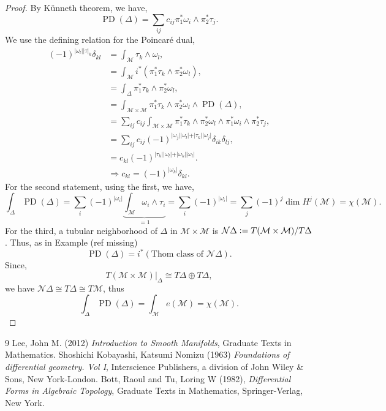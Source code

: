 \documentclass[10pt]{article}
\DeclareMathOperator{\PD}{PD}
\newcommand{\defeq}{\vcentcolon=}
\newcommand{\M}[0]{\mathcal{M}}
\begin{document}
\begin{proof}
  By Künneth theorem, we have,
  \begin{equation*}
    \PD(\Delta) = \sum_{ij}c_{ij}\pi_1^*\omega_i\wedge\pi_2^*\tau_j.
  \end{equation*}
  We use the defining relation for the Poincaré dual, 
  \begin{align*}
    (-1)^{\vert\omega_l\vert\vert\tau\vert_k}\delta_{kl}& =\int_\M\tau_k\wedge\omega_l,\\
    & = \int_\M i^*(\pi^*_1\tau_k\wedge\pi_2^*\omega_l),\\
    & = \int_\Delta \pi_1^*\tau_k\wedge\pi_2^*\omega_l,\\
    & = \int_{\M\times\M}\pi_1^*\tau_k\wedge\pi_2^*\omega_l\wedge\PD(\Delta),\\
    & = \sum_{ij}c_{ij}\int_{\M\times\M}\pi^*_1\tau_k\wedge\pi_2^*\omega_l\wedge\pi^*_1\omega_i\wedge\pi_2^*\tau_j,\\
    & = \sum_{ij}c_{ij}(-1)^{\vert\omega_j\vert\vert\omega_l\vert+\vert\tau_k\vert\vert\omega_j\vert}\delta_{ik}\delta_{lj},\\
    & = c_{kl}(-1)^{\vert\tau_k\vert\vert\omega_l\vert+\vert\omega_k\vert\vert\omega_l\vert}.\\
    &\Rightarrow c_{kl} = (-1)^{\vert\omega_k\vert}\delta_{kl}.
  \end{align*}
  For the second statement, using the first, we have,
  \begin{equation*}
    \int_\Delta\PD(\Delta) = \sum_{i}(-1)^{\vert\omega_i\vert}\underbrace{\int_\M\omega_i\wedge\tau_i}_{=1}=\sum_{i}(-1)^{\vert\omega_i\vert} = \sum_{j}(-1)^j\dim H^j(\M)=\chi(\M).
  \end{equation*}
  For the third, a tubular neighborhood of $\Delta$ in $\M\times\M$ is $\mathcal{N}\Delta\defeq T(\M\times\M)/T\Delta$. Thus, as in Example (ref missing)
  \begin{equation*}
    \PD(\Delta)=i^*(\text{Thom class of }\mathcal{N}\Delta).
  \end{equation*}
  Since,
  \begin{equation*}
    T(\M\times\M)|_\Delta\cong T\Delta\oplus T\Delta,
  \end{equation*}
  we have $\mathcal{N}\Delta\cong T\Delta\cong T\M$, thus 
  \begin{equation*}
    \int_\Delta\PD(\Delta) = \int_\M e(\M)=\chi(\M).
  \end{equation*}
\end{proof}

\begin{thebibliography}{9}
Lee, John M. (2012) \emph{Introduction to Smooth Manifolds}, Graduate Texts in Mathematics.
Shoshichi Kobayashi, Katsumi Nomizu (1963) \emph{Foundations of differential geometry. {V}ol {I}}, Interscience Publishers, a division of John Wiley \& Sons, New
              York-London.
 Bott, Raoul and Tu, Loring W (1982), \emph{Differential Forms in Algebraic Topology}, Graduate Texts in Mathematics, Springer-Verlag, New York.
\end{thebibliography}
\end{document}
